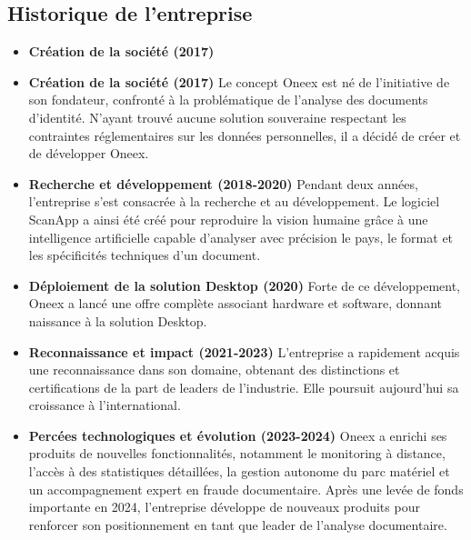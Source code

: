 \subsection{Historique de l’entreprise}

\begin{itemize}
	\item \textbf{Création de la société (2017)}
	\item \textbf{Création de la société (2017)}
	      Le concept Oneex est né de l’initiative de son fondateur, confronté à la problématique de l’analyse des documents d’identité. N’ayant trouvé aucune solution souveraine respectant les contraintes réglementaires sur les données personnelles, il a décidé de créer et de développer Oneex.

	\item \textbf{Recherche et développement (2018-2020)}
	      Pendant deux années, l’entreprise s’est consacrée à la recherche et au développement. Le logiciel ScanApp a ainsi été créé pour reproduire la vision humaine grâce à une intelligence artificielle capable d’analyser avec précision le pays, le format et les spécificités techniques d’un document.

	\item \textbf{Déploiement de la solution Desktop (2020)}
	      Forte de ce développement, Oneex a lancé une offre complète associant hardware et software, donnant naissance à la solution Desktop.

	\item \textbf{Reconnaissance et impact (2021-2023)}
	      L’entreprise a rapidement acquis une reconnaissance dans son domaine, obtenant des distinctions et certifications de la part de leaders de l’industrie. Elle poursuit aujourd’hui sa croissance à l’international.

	\item \textbf{Percées technologiques et évolution (2023-2024)}
	      Oneex a enrichi ses produits de nouvelles fonctionnalités, notamment le monitoring à distance, l’accès à des statistiques détaillées, la gestion autonome du parc matériel et un accompagnement expert en fraude documentaire. Après une levée de fonds importante en 2024, l’entreprise développe de nouveaux produits pour renforcer son positionnement en tant que leader de l’analyse documentaire.
\end{itemize}


